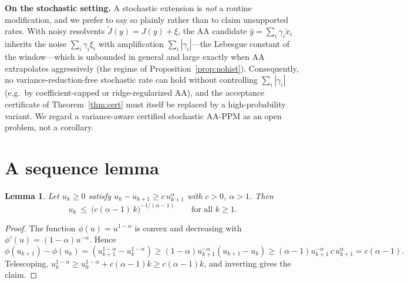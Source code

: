 \documentclass[11pt]{article}
\newtheorem{lemma}[theorem]{Lemma}
\theoremstyle{definition}
\theoremstyle{remark}
\newcommand{\abs}[1]{| #1 |}
\begin{document}
\textbf{On the stochastic setting.} A stochastic extension is \emph{not} a
routine modification, and we prefer to say so plainly rather than to claim
unsupported rates. With noisy resolvents
$\widetilde J(y)=J(y)+\xi$, the AA candidate
$\hat y=\sum_i\gamma_i\widetilde x_i$ inherits the noise
$\sum_i\gamma_i\xi_i$ with amplification $\sum_i\abs{\gamma_i}$---the
Lebesgue constant of the window---which is unbounded in general and large
exactly when AA extrapolates aggressively (the regime of
Proposition~\ref{prop:nohist}). Consequently, no variance-reduction-free
stochastic rate can hold without controlling $\sum_i\abs{\gamma_i}$ (e.g.\
by coefficient-capped or ridge-regularized AA), and the acceptance
certificate of Theorem~\ref{thm:cert} must itself be replaced by a
high-probability variant. We regard a variance-aware certified stochastic
AA-PPM as an open problem, not a corollary.

\appendix
\section{A sequence lemma}\label{app:seq}

\begin{lemma}\label{lem:seq}
Let $u_k\ge0$ satisfy $u_k-u_{k+1}\ge c\,u_{k+1}^{\alpha}$ with $c>0$,
$\alpha>1$. Then
\[
u_k\ \le\ \big(c(\alpha-1)\,k\big)^{-1/(\alpha-1)}
\qquad\text{for all }k\ge1 .
\]
\end{lemma}
\begin{proof}
The function $\phi(u)=u^{1-\alpha}$ is convex and decreasing with
$\phi'(u)=(1-\alpha)u^{-\alpha}$. Hence
\[
\phi(u_{k+1})-\phi(u_k)
=(u_{k+1}^{1-\alpha}-u_k^{1-\alpha})
\ge (1-\alpha)u_{k+1}^{-\alpha}(u_{k+1}-u_k)
\ge (\alpha-1)u_{k+1}^{-\alpha}\,c\,u_{k+1}^{\alpha}
=c(\alpha-1).
\]
Telescoping,
$u_k^{1-\alpha}\ge u_0^{1-\alpha}+c(\alpha-1)k\ge c(\alpha-1)k$, and
inverting gives the claim.
\end{proof}
\end{document}
